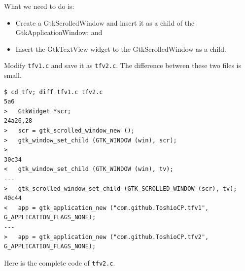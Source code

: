 What we need to do is:

\begin{itemize}
\tightlist
\item
  Create a GtkScrolledWindow and insert it as a child of the
  GtkApplicationWindow; and
\item
  Insert the GtkTextView widget to the GtkScrolledWindow as a child.
\end{itemize}

Modify \passthrough{\lstinline!tfv1.c!} and save it as
\passthrough{\lstinline!tfv2.c!}. The difference between these two files
is small.

\begin{lstlisting}
$ cd tfv; diff tfv1.c tfv2.c
5a6
>   GtkWidget *scr;
24a26,28
>   scr = gtk_scrolled_window_new ();
>   gtk_window_set_child (GTK_WINDOW (win), scr);
> 
30c34
<   gtk_window_set_child (GTK_WINDOW (win), tv);
---
>   gtk_scrolled_window_set_child (GTK_SCROLLED_WINDOW (scr), tv);
40c44
<   app = gtk_application_new ("com.github.ToshioCP.tfv1", G_APPLICATION_FLAGS_NONE);
---
>   app = gtk_application_new ("com.github.ToshioCP.tfv2", G_APPLICATION_FLAGS_NONE);
\end{lstlisting}

Here is the complete code of \passthrough{\lstinline!tfv2.c!}.

